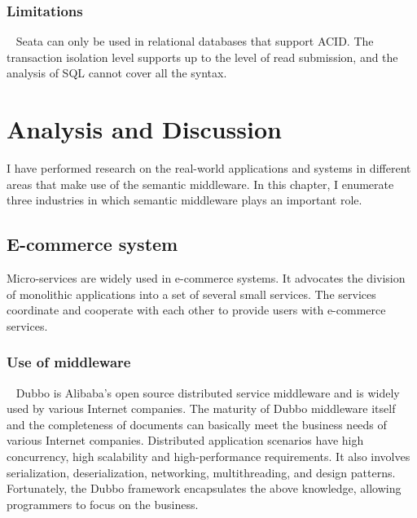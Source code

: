 \documentclass[conference]{IEEEtran}
\begin{document}
\subsubsection{Limitations}
\
\newline
\indent
Seata can only be used in relational databases that support ACID.
The transaction isolation level supports up to the level of read submission, and the analysis of SQL cannot cover all the syntax.

\section{Analysis and Discussion}

I have performed research on the real-world applications and systems in different areas that make use of the semantic middleware. In this chapter, I enumerate three industries in which semantic middleware plays an important role.

\subsection{E-commerce system}

Micro-services are widely used in e-commerce systems. It advocates the division of monolithic applications into a set of several small services. The services coordinate and cooperate with each other to provide users with e-commerce services.

\subsubsection{Use of middleware}
\
\newline
\indent
Dubbo is Alibaba's open source distributed service middleware and is widely used by various Internet companies. The maturity of Dubbo middleware itself and the completeness of documents can basically meet the business needs of various Internet companies. Distributed application scenarios have high concurrency, high scalability and high-performance requirements. It also involves serialization, deserialization, networking, multithreading, and design patterns. Fortunately, the Dubbo framework encapsulates the above knowledge, allowing programmers to focus on the business.
\end{document}
